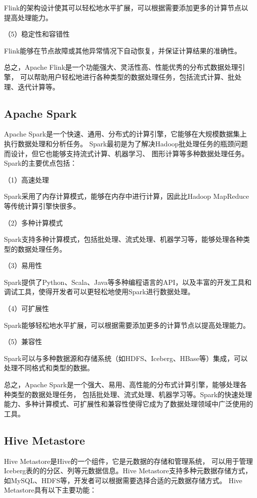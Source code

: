 Flink的架构设计使其可以轻松地水平扩展，可以根据需要添加更多的计算节点以提高处理能力。

（5）稳定性和容错性

Flink能够在节点故障或其他异常情况下自动恢复，并保证计算结果的准确性。

总之，Apache Flink是一个功能强大、灵活性高、性能优秀的分布式数据处理引擎，
可以帮助用户轻松地进行各种类型的数据处理任务，包括流式计算、批处理、迭代计算等。

\subsection{Apache Spark}

Apache Spark是一个快速、通用、分布式的计算引擎，它能够在大规模数据集上执行数据处理和分析任务。
Spark最初是为了解决Hadoop批处理任务的瓶颈问题而设计，但它也能够支持流式计算、机器学习、
图形计算等多种数据处理任务\cite{23}。Spark的主要优点包括：

（1）高速处理

Spark采用了内存计算模式，能够在内存中进行计算，因此比Hadoop MapReduce等传统计算引擎快很多。

（2）多种计算模式

Spark支持多种计算模式，包括批处理、流式处理、机器学习等，能够处理各种类型的数据处理任务\cite{43}。

（3）易用性

Spark提供了Python、Scala、Java等多种编程语言的API，以及丰富的开发工具和调试工具，使得开发者可以更轻松地使用Spark进行数据处理。

（4）可扩展性

Spark能够轻松地水平扩展，可以根据需要添加更多的计算节点以提高处理能力。

（5）兼容性

Spark可以与多种数据源和存储系统（如HDFS、Iceberg、HBase等）集成，可以处理不同格式和类型的数据。

总之，Apache Spark是一个强大、易用、高性能的分布式计算引擎，能够处理各种类型的数据处理任务，
包括批处理、流式处理、机器学习等。Spark的快速处理能力、多种计算模式、可扩展性和兼容性使得它成为了数据处理领域中广泛使用的工具。

\subsection{Hive Metastore}

Hive Metastore是Hive的一个组件，它是元数据的存储和管理系统，
可以用于管理Iceberg表的的分区、列等元数据信息。Hive Metastore支持多种元数据存储方式，
如MySQL、HDFS等，开发者可以根据需要选择合适的元数据存储方式\cite{30}。
Hive Metastore具有以下主要功能：

